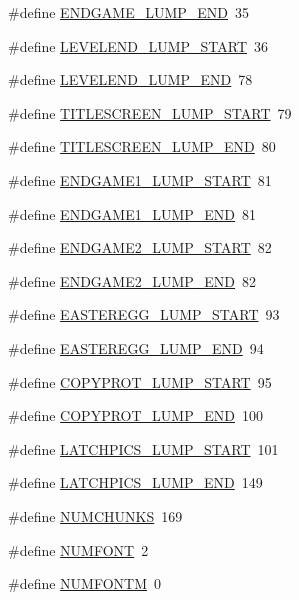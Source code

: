 \begin{DoxyCompactItemize}
\item 
\#define \hyperlink{GFXV__SOD_8H_aa3c67cc2be64b99935a1f6e9fb1e4456}{ENDGAME\_\-LUMP\_\-END}~35
\item 
\#define \hyperlink{GFXV__SOD_8H_a1895eb960cb12bb7b49bf322e79d6c80}{LEVELEND\_\-LUMP\_\-START}~36
\item 
\#define \hyperlink{GFXV__SOD_8H_a01e5f4d5f8e05beb4315b9ad907e06e7}{LEVELEND\_\-LUMP\_\-END}~78
\item 
\#define \hyperlink{GFXV__SOD_8H_a7a3b353d78a22edb2141bfde582d15cc}{TITLESCREEN\_\-LUMP\_\-START}~79
\item 
\#define \hyperlink{GFXV__SOD_8H_aa2ea9b3993d1853ba97b4baef70e7d4f}{TITLESCREEN\_\-LUMP\_\-END}~80
\item 
\#define \hyperlink{GFXV__SOD_8H_acf516fd576684fde80b59e55172568e7}{ENDGAME1\_\-LUMP\_\-START}~81
\item 
\#define \hyperlink{GFXV__SOD_8H_a2cc53830a9e7a25b6ec5c35eede72190}{ENDGAME1\_\-LUMP\_\-END}~81
\item 
\#define \hyperlink{GFXV__SOD_8H_aad441fe52af39d28001c152a972028c2}{ENDGAME2\_\-LUMP\_\-START}~82
\item 
\#define \hyperlink{GFXV__SOD_8H_a54c727bb54a20fc0dfc79d623f7b1f6a}{ENDGAME2\_\-LUMP\_\-END}~82
\item 
\#define \hyperlink{GFXV__SOD_8H_ad2e2ec01039d972a2f3d92c0978fd52d}{EASTEREGG\_\-LUMP\_\-START}~93
\item 
\#define \hyperlink{GFXV__SOD_8H_ab82a1184abc120ceb93994338a350216}{EASTEREGG\_\-LUMP\_\-END}~94
\item 
\#define \hyperlink{GFXV__SOD_8H_a35bf838342f1986f8224ae615697a326}{COPYPROT\_\-LUMP\_\-START}~95
\item 
\#define \hyperlink{GFXV__SOD_8H_a99202cacfafe5a47a6b2c42546395be5}{COPYPROT\_\-LUMP\_\-END}~100
\item 
\#define \hyperlink{GFXV__SOD_8H_a88207d485bad504249067e714794e823}{LATCHPICS\_\-LUMP\_\-START}~101
\item 
\#define \hyperlink{GFXV__SOD_8H_a366d7af9e92d0a7d4ee631d44c4ecbf7}{LATCHPICS\_\-LUMP\_\-END}~149
\item 
\#define \hyperlink{GFXV__SOD_8H_a06c8b188cc3cdd25a5451beeefddfa66}{NUMCHUNKS}~169
\item 
\#define \hyperlink{GFXV__SOD_8H_a7686ac8ed1dbf71ebee2b4711dae0edd}{NUMFONT}~2
\item 
\#define \hyperlink{GFXV__SOD_8H_afd7a523b060f425fd737a94c044892ac}{NUMFONTM}~0
\item 

\end{DoxyCompactItemize}
